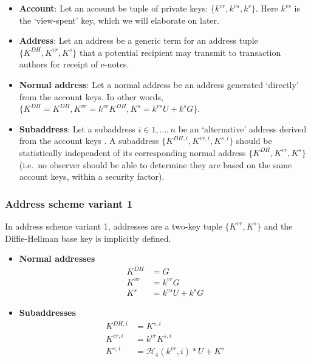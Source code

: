 \begin{itemize}
    \item \textbf{Account}: Let an account be tuple of private keys: $\{k^{vr}, k^{vs}, k^s\}$. Here $k^{vs}$ is the `view-spent' key, which we will elaborate on later.

    \item \textbf{Address}: Let an address be a generic term for an address tuple $\{K^{DH}, K^{vr}, K^s\}$ that a potential recipient may transmit to transaction authors for receipt of e-notes.

    \item \textbf{Normal address}: Let a normal address be an address generated `directly' from the account keys. In other words, $\{K^{DH} = K^{DH}, K^{vr} = k^{vr} K^{DH}, K^s = k^{vs} U + k^s G\}$.

    \item \textbf{Subaddress}: Let a subaddress $i \in 1,...,n$ be an `alternative' address derived from the account keys \cite{MRL-0006-subaddresses, subaddress-pull-request}. A subaddress $\{K^{DH,i}, K^{vr,i}, K^{s,i}\}$ should be statistically independent of its corresponding normal address $\{K^{DH}, K^{vr}, K^s\}$ (i.e.\ no observer should be able to determine they are based on the same account keys, within a security factor).
\end{itemize}

\subsubsection{Address scheme variant 1}

In address scheme variant 1, addresses are a two-key tuple $\{K^{vr}, K^s\}$ and the Diffie-Hellman base key is implicitly defined.

\begin{itemize}
    \item \textbf{Normal addresses}
    \begin{align*}
        K^{DH} &= G  \\
        K^{vr} &= k^{vr} G  \\
        K^{s} &= k^{vs} U + k^s G
    \end{align*}

    \item \textbf{Subaddresses}
    \begin{align*}
        K^{DH,i} &= K^{s,i}  \\
        K^{vr,i} &= k^{vr} K^{s,i}  \\
        K^{s,i} &= \mathcal{H}_4(k^{vr},i)*U + K^s
    \end{align*}
\end{itemize}

